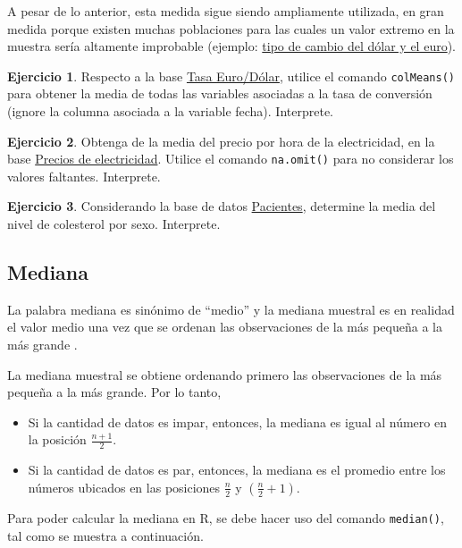 \documentclass[
  11pt,
]{book}
\providecommand{\tightlist}{%
  \setlength{\itemsep}{0pt}\setlength{\parskip}{0pt}}
\theoremstyle{definition}
\theoremstyle{definition}
\theoremstyle{definition}
\newtheorem{exercise}{Ejercicio}[chapter]
\theoremstyle{definition}
\theoremstyle{remark}
\begin{document}
A pesar de lo anterior, esta medida sigue siendo ampliamente utilizada, en gran medida porque existen muchas poblaciones para las cuales un valor extremo en la muestra sería altamente improbable (ejemplo: \href{https://www.google.com/finance/quote/EUR-CLP?window=MAX&comparison=USD-CLP}{tipo de cambio del dólar y el euro}).

\begin{exercise}
Respecto a la base \hyperref[TasaEURUSD]{Tasa Euro/Dólar}, utilice el comando \texttt{colMeans()} para obtener la media de todas las variables asociadas a la tasa de conversión (ignore la columna asociada a la variable fecha). Interprete.
\end{exercise}

\begin{exercise}
Obtenga de la media del precio por hora de la electricidad, en la base \hyperref[PreciosElectricidad]{Precios de electricidad}. Utilice el comando \texttt{na.omit()} para no considerar los valores faltantes. Interprete.
\end{exercise}

\begin{exercise}
Considerando la base de datos \hyperref[Pacientes]{Pacientes}, determine la media del nivel de colesterol por sexo. Interprete.
\end{exercise}

\subsection{Mediana}\label{mediana}

La palabra mediana es sinónimo de ``medio'' y la mediana muestral es en realidad el valor medio una vez que se ordenan las observaciones de la más pequeña a la más grande \citep[página 26]{Devore}.

La mediana muestral se obtiene ordenando primero las observaciones de la más pequeña a la más grande. Por lo tanto,

\begin{itemize}
\tightlist
\item
  Si la cantidad de datos es impar, entonces, la mediana es igual al número en la posición \(\frac{n+1}{2}\).
\item
  Si la cantidad de datos es par, entonces, la mediana es el promedio entre los números ubicados en las posiciones \(\frac{n}{2}\) y \((\frac{n}{2}+1)\).
\end{itemize}

Para poder calcular la mediana en R, se debe hacer uso del comando \texttt{median()}, tal como se muestra a continuación.
\end{document}
